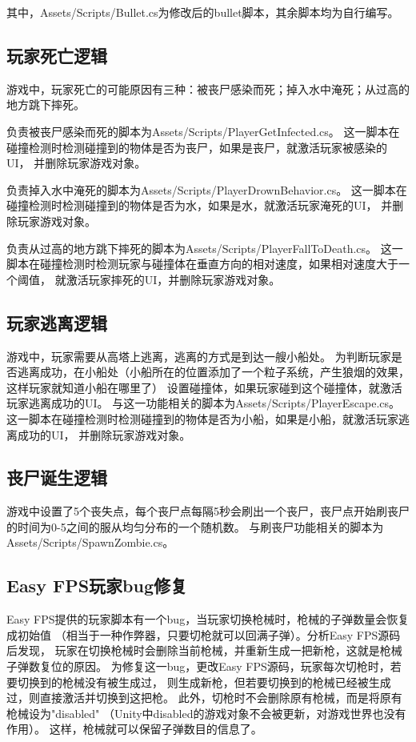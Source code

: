 \documentclass{article}
\begin{document}
其中，Assets/Scripts/Bullet.cs为修改后的bullet脚本，其余脚本均为自行编写。

\subsection{玩家死亡逻辑}

游戏中，玩家死亡的可能原因有三种：被丧尸感染而死；掉入水中淹死；从过高的地方跳下摔死。

负责被丧尸感染而死的脚本为Assets/Scripts/PlayerGetInfected.cs。
这一脚本在碰撞检测时检测碰撞到的物体是否为丧尸，如果是丧尸，就激活玩家被感染的UI，
并删除玩家游戏对象。

负责掉入水中淹死的脚本为Assets/Scripts/PlayerDrownBehavior.cs。
这一脚本在碰撞检测时检测碰撞到的物体是否为水，如果是水，就激活玩家淹死的UI，
并删除玩家游戏对象。

负责从过高的地方跳下摔死的脚本为Assets/Scripts/PlayerFallToDeath.cs。
这一脚本在碰撞检测时检测玩家与碰撞体在垂直方向的相对速度，如果相对速度大于一个阈值，
就激活玩家摔死的UI，并删除玩家游戏对象。

\subsection{玩家逃离逻辑}

游戏中，玩家需要从高塔上逃离，逃离的方式是到达一艘小船处。
为判断玩家是否逃离成功，在小船处（小船所在的位置添加了一个粒子系统，产生狼烟的效果，这样玩家就知道小船在哪里了）
设置碰撞体，如果玩家碰到这个碰撞体，就激活玩家逃离成功的UI。
与这一功能相关的脚本为Assets/Scripts/PlayerEscape.cs。
这一脚本在碰撞检测时检测碰撞到的物体是否为小船，如果是小船，就激活玩家逃离成功的UI，
并删除玩家游戏对象。

\subsection{丧尸诞生逻辑}

游戏中设置了5个丧失点，每个丧尸点每隔5秒会刷出一个丧尸，丧尸点开始刷丧尸的时间为0-5之间的服从均匀分布的一个随机数。
与刷丧尸功能相关的脚本为Assets/Scripts/SpawnZombie.cs。

\subsection{Easy FPS玩家bug修复}

Easy FPS提供的玩家脚本有一个bug，当玩家切换枪械时，枪械的子弹数量会恢复成初始值
（相当于一种作弊器，只要切枪就可以回满子弹）。分析Easy FPS源码后发现，
玩家在切换枪械时会删除当前枪械，并重新生成一把新枪，这就是枪械子弹数复位的原因。
为修复这一bug，更改Easy FPS源码，玩家每次切枪时，若要切换到的枪械没有被生成过，
则生成新枪，但若要切换到的枪械已经被生成过，则直接激活并切换到这把枪。
此外，切枪时不会删除原有枪械，而是将原有枪械设为"disabled"
（Unity中disabled的游戏对象不会被更新，对游戏世界也没有作用）。
这样，枪械就可以保留子弹数目的信息了。
\end{document}
